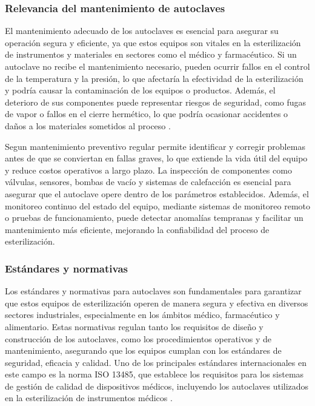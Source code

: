 \subsubsection{Relevancia del mantenimiento de autoclaves}
El mantenimiento adecuado de los autoclaves es esencial para asegurar su operación segura y eficiente, ya que estos equipos son vitales en la esterilización de instrumentos y materiales en sectores como el médico y farmacéutico. Si un autoclave no recibe el mantenimiento necesario, pueden ocurrir fallos en el control de la temperatura y la presión, lo que afectaría la efectividad de la esterilización y podría causar la contaminación de los equipos o productos. Además, el deterioro de sus componentes puede representar riesgos de seguridad, como fugas de vapor o fallos en el cierre hermético, lo que podría ocasionar accidentes o daños a los materiales sometidos al proceso \citep{Relevancia}.


Segun \cite{Relevancia} mantenimiento preventivo regular permite identificar y corregir problemas antes de que se conviertan en fallas graves, lo que extiende la vida útil del equipo y reduce costos operativos a largo plazo. La inspección de componentes como válvulas, sensores, bombas de vacío y sistemas de calefacción es esencial para asegurar que el autoclave opere dentro de los parámetros establecidos. Además, el monitoreo continuo del estado del equipo, mediante sistemas de monitoreo remoto o pruebas de funcionamiento, puede detectar anomalías tempranas y facilitar un mantenimiento más eficiente, mejorando la confiabilidad del proceso de esterilización.

\subsubsection{Estándares y normativas}
Los estándares y normativas para autoclaves son fundamentales para garantizar que estos equipos de esterilización operen de manera segura y efectiva en diversos sectores industriales, especialmente en los ámbitos médico, farmacéutico y alimentario. Estas normativas regulan tanto los requisitos de diseño y construcción de los autoclaves, como los procedimientos operativos y de mantenimiento, asegurando que los equipos cumplan con los estándares de seguridad, eficacia y calidad. Uno de los principales estándares internacionales en este campo es la norma ISO 13485, que establece los requisitos para los sistemas de gestión de calidad de dispositivos médicos, incluyendo los autoclaves utilizados en la esterilización de instrumentos médicos  \citep{iso_13485_2016}.

